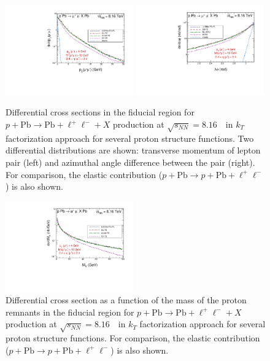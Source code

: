 \begin{figure}[!h]
\includegraphics[width=0.49\textwidth]{figures_Marta/pt-sum-l.pdf}
 \includegraphics[width=0.49\textwidth]{figures_Marta/phi-l.pdf}
\caption{Differential cross sections in the fiducial region for $p+\textrm{Pb}\rightarrow \textrm{Pb} + \ell^+\ell^- + X$ production at $\sqrt{s_{N N}} = 8.16$~\TeV\ in $k_T$ factorization approach for several proton structure functions.
Two differential distributions are shown: transverse momentum of lepton pair (left) and azimuthal angle difference between the pair (right).
For comparison, the elastic contribution ($p+\textrm{Pb}\rightarrow p+ \textrm{Pb} + \ell^+\ell^-$) is also shown.
}
 \label{fig:kt_figures2}
\end{figure}


\begin{figure}[!h]

 \includegraphics[width=0.49\textwidth]{figures_Marta/MX-l.pdf}
\caption{Differential cross section as a function of the mass of the proton remnants in the fiducial region for $p+\textrm{Pb}\rightarrow \textrm{Pb} + \ell^+\ell^- + X$ production at $\sqrt{s_{N N}} = 8.16$~\TeV\ in $k_T$ factorization approach for several proton structure functions.
For comparison, the elastic contribution ($p+\textrm{Pb}\rightarrow p+ \textrm{Pb} + \ell^+\ell^-$) is also shown.
}
 \label{fig:kt_figures3}
\end{figure}





